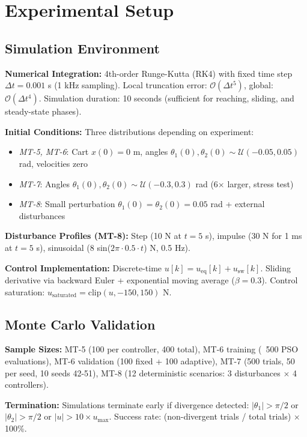 \documentclass[conference]{IEEEtran}
\begin{document}
\section{Experimental Setup}

\subsection{Simulation Environment}

\textbf{Numerical Integration:} 4th-order Runge-Kutta (RK4) with fixed time step $\Delta t = 0.001$ s (1 kHz sampling). Local truncation error: $\mathcal{O}(\Delta t^5)$, global: $\mathcal{O}(\Delta t^4)$. Simulation duration: 10 seconds (sufficient for reaching, sliding, and steady-state phases).

\textbf{Initial Conditions:} Three distributions depending on experiment:
\begin{itemize}
\item \emph{MT-5, MT-6}: Cart $x(0) = 0$ m, angles $\theta_1(0), \theta_2(0) \sim \mathcal{U}(-0.05, 0.05)$ rad, velocities zero
\item \emph{MT-7}: Angles $\theta_1(0), \theta_2(0) \sim \mathcal{U}(-0.3, 0.3)$ rad (6$\times$ larger, stress test)
\item \emph{MT-8}: Small perturbation $\theta_1(0) = \theta_2(0) = 0.05$ rad + external disturbances
\end{itemize}

\textbf{Disturbance Profiles (MT-8):} Step (10 N at $t=5$ s), impulse (30 N for 1 ms at $t=5$ s), sinusoidal (8 sin($2\pi \cdot 0.5 \cdot t$) N, 0.5 Hz).

\textbf{Control Implementation:} Discrete-time $u[k] = u_{\text{eq}}[k] + u_{\text{sw}}[k]$. Sliding derivative via backward Euler + exponential moving average ($\beta = 0.3$). Control saturation: $u_{\text{saturated}} = \text{clip}(u, -150, 150)$ N.

\subsection{Monte Carlo Validation}

\textbf{Sample Sizes:} MT-5 (100 per controller, 400 total), MT-6 training (~500 PSO evaluations), MT-6 validation (100 fixed + 100 adaptive), MT-7 (500 trials, 50 per seed, 10 seeds 42-51), MT-8 (12 deterministic scenarios: 3 disturbances $\times$ 4 controllers).

\textbf{Termination:} Simulations terminate early if divergence detected: $|\theta_1| > \pi/2$ or $|\theta_2| > \pi/2$ or $|u| > 10 \times u_{\max}$. Success rate: (non-divergent trials / total trials) $\times$ 100\%.
\end{document}
